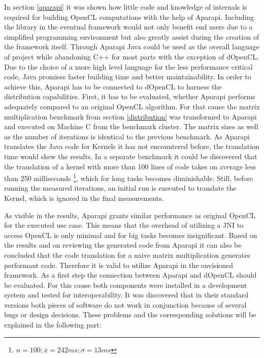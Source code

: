 In section \ref{aparapi} it was shown how little code and knowledge of internals is required for building OpenCL computations with the help of Aparapi. Including the library in the eventual framework would not only benefit end users due to a simplified programming environment but also greatly assist during the creation of the framework itself. Through Aparapi Java could be used as the overall language of project while abandoning C++ for most parts with the exception of dOpenCL. Due to the choice of a more high level language for the less performance critical code, Java promises faster building time and better maintainability. In order to achieve this, Aparapi has to be connected to dOpenCL to harness the distribution capabilities. First, it has to be evaluated, whether Aparapi performs adequately compared to an original OpenCL algorithm. For that cause the matrix multiplication benchmark from section \ref{distribution} was transformed to Aparapi and executed on Machine C from the benchmark cluster. The matrix sizes as well as the number of iterations is identical to the previous benchmark. As Aparapi translates the Java code for Kernels it has not encountered before, the translation time would skew the results. In a separate benchmark it could be discovered that the translation of a kernel with more than 100 lines of code takes on average less than 250 milliseconds \footnote{$n=100; \bar{x} = 242ms; \sigma = 13ms$}, which for long tasks becomes diminishable. Still, before running the measured iterations, an initial run is executed to translate the Kernel, which is ignored in the final measurements. 


As visible in the results, Aparapi grants similar performance as original OpenCL for the executed use case. This means that the overhead of utilizing a JNI to access OpenCL is only minimal and for big tasks becomes insignificant. Based on the results and on reviewing the generated code from Aparapi it can also be concluded that the code translation for a naive matrix multiplication generates performant code. Therefore it is valid to utilize Aparapi in the envisioned framework. As a first step the connection between Aparapi and dOpenCL should be evaluated. For this cause both components were installed in a development system and tested for interoperability. It was discovered that in their standard versions both pieces of software do not work in conjunction because of several bugs or design decisions. These problems and the corresponding solutions will be explained in the following part:

